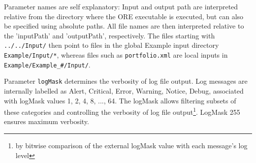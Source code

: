 Parameter names are self explanatory: Input and output path are interpreted relative from the directory where the ORE
executable is executed, but can also be specified using absolute paths. All file names are then interpreted relative to the
'inputPath' and 'outputPath', respectively. The files starting with {\tt ../../Input/} then point to files in the global
Example input directory {\tt Example/Input/*}, whereas files such as {\tt portfolio.xml} are local inputs in {\tt 
Example/Example\_\#/Input/}. 

Parameter {\tt logMask} determines the verbosity of log file output. Log messages are 
internally labelled as Alert, Critical, Error, Warning, Notice, Debug, associated with logMask values 1, 2, 4, 8, ..., 64. 
The logMask allows filtering subsets of these categories and controlling the verbosity of log file output\footnote{by bitwise comparison of the external logMask value with each message's log level}. LogMask 255 ensures maximum verbosity. \\

